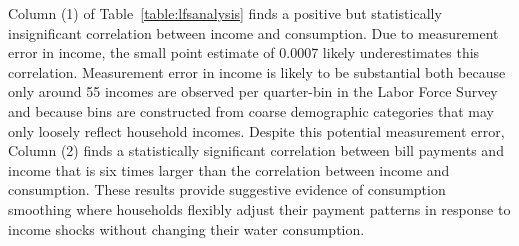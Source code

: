\documentclass[12pt]{article}
\begin{document}
Column (1) of Table~\ref{table:lfsanalysis} finds a positive but statistically insignificant correlation between income and consumption.  Due to measurement error in income, the small point estimate of 0.0007 likely underestimates this correlation.  Measurement error in income is likely to be substantial both because only around 55 incomes are observed per quarter-bin in the Labor Force Survey and because bins are constructed from coarse demographic categories that may only loosely reflect household incomes.  Despite this potential measurement error, Column (2) finds a statistically significant correlation between bill payments and income that is six times larger than the correlation between income and consumption.  These results provide suggestive evidence of consumption smoothing where households flexibly adjust their payment patterns in response to income shocks without changing their water consumption.  







\end{document}

